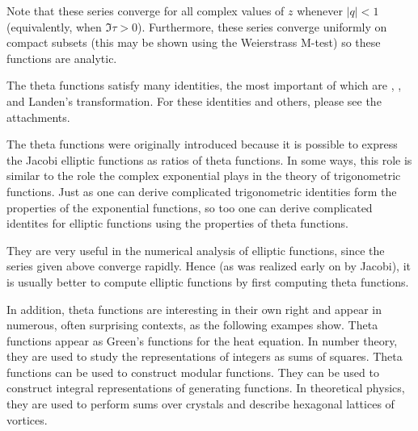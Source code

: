 \documentclass[12pt]{article}
\begin{document}
Note that these series converge for all complex values of $z$ whenever $|q| < 1$ (equivalently, when $\Im \tau > 0$).  Furthermore, these series converge uniformly on compact subsets (this may be shown using the Weierstrass M-test) so these functions are analytic.

The theta functions satisfy many identities, the most important of which are  , , and Landen's transformation.  For these identities and others, please see the attachments.

The theta functions were originally introduced because it is possible to express the Jacobi elliptic functions as ratios of theta functions.  In some ways, this role is similar to the role the complex exponential plays in the theory of trigonometric functions.  Just as one can derive complicated trigonometric identities form the properties of the exponential functions, so too one can derive complicated identites for elliptic functions using the properties of theta functions.

They are very useful in the numerical analysis of elliptic functions, since the series given above converge rapidly.  Hence (as was realized early on by Jacobi), it is usually better to compute elliptic functions by first computing theta functions.

In addition, theta functions are interesting in their own right and appear in numerous, often surprising contexts, as the following exampes show.  Theta functions appear as Green's functions for the heat equation.  In number theory, they are used to study the representations of integers as sums of squares.  Theta functions can be used to construct modular functions.  They can be used to construct integral representations of generating functions.  In theoretical physics, they are used to perform sums over crystals and describe hexagonal lattices of vortices.
\end{document}
